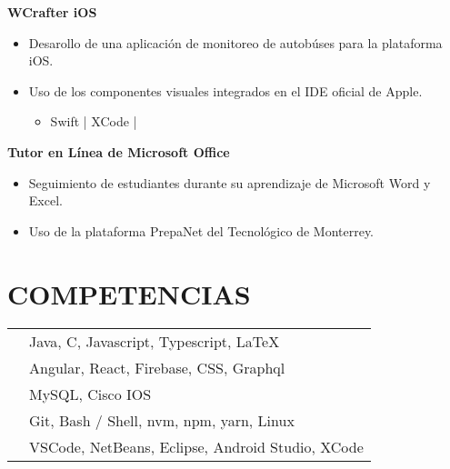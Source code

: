 \documentclass{res}
\begin{document}
\begin{resume}
    \textbf{WCrafter iOS} 
    \begin{itemize}
        \item Desarollo de una aplicación de monitoreo de autobúses para la plataforma iOS.
        \item Uso de los componentes visuales integrados en el IDE oficial de Apple.
        \begin{itemize}
            \item Swift | XCode |
        \end{itemize}
    \end{itemize}

    \textbf{Tutor en Línea de Microsoft Office} 
    \begin{itemize}
        \item Seguimiento de estudiantes durante su aprendizaje de Microsoft Word y Excel.
        \item Uso de la plataforma PrepaNet del Tecnológico de Monterrey.
    \end{itemize}

    \section{\large{COMPETENCIAS}} 
    \begin{tabularx}{15cm}{SB}
         &
        Java, C, Javascript, Typescript, LaTeX
        \\
         &
        Angular, React, Firebase, CSS, Graphql
        \\
         &
        MySQL, Cisco IOS
        \\
         &
        Git, Bash / Shell, nvm, npm, yarn, Linux
        \\
         &
        VSCode, NetBeans, Eclipse, Android Studio, XCode
    \end{tabularx}
\end{resume}
\end{document}
